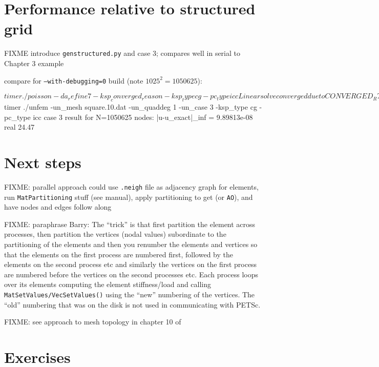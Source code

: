 \section{Performance relative to \pDMDA structured grid}

FIXME introduce \texttt{genstructured.py} and case 3; compares well in serial to Chapter 3 example

compare for \texttt{--with-debugging=0} build (note $1025^2=1050625$):
\begin{cline}
$ timer ./poisson -da_refine 7 -ksp_converged_reason -ksp_type cg -pc_type icc
Linear solve converged due to CONVERGED_RTOL iterations 721
on 1025 x 1025 grid:  error |u-uexact|_inf = 5.29691e-08
real 18.67
$ timer ./unfem -un_mesh square.10.dat -un_quaddeg 1 -un_case 3 -ksp_type cg -pc_type icc
case 3 result for N=1050625 nodes:  |u-u_exact|_inf = 9.89813e-08
real 24.47
\end{cline}

\section{Next steps}

FIXME: parallel approach could use \Triangle \texttt{.neigh} file as adjacency graph for elements, run \texttt{MatPartitioning} stuff (see manual), apply partitioning to get \pIS (or \texttt{AO}), and have nodes and edges follow along

FIXME: paraphrase Barry: The ``trick'' is that first partition the element across processes, then partition the vertices (nodal values) subordinate to the partitioning of the elements and then you renumber the elements and vertices so that the elements on the first process are numbered first, followed by the elements on the second process etc and similarly the vertices on the first process are numbered before the vertices on the second processes etc.  Each process loops over its elements computing the element stiffness/load and calling \texttt{MatSetValues/VecSetValues()} using the ``new'' numbering of the vertices.  The ``old'' numbering that was on the disk is not used in communicating with PETSc.

FIXME: see approach to mesh topology in chapter 10 of \citep{Loggetal2012}


\section{Exercises}

